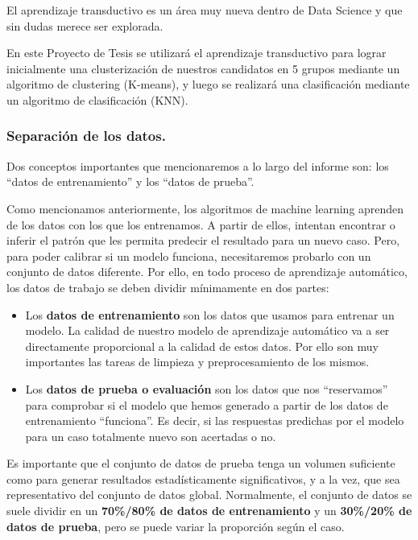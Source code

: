 \documentclass[12pt,a4paper]{article}
\begin{document}
\begin{sloppypar}
El aprendizaje transductivo es un área muy nueva dentro de Data Science y que sin dudas merece ser explorada.

En este Proyecto de Tesis se utilizará el aprendizaje transductivo para lograr inicialmente una clusterización de nuestros candidatos en 5 grupos mediante un algoritmo de clustering (K-means), y luego se realizará una clasificación mediante un algoritmo de clasificación (KNN). 

\subsubsection{Separación de los datos.}\label{Separacion datos}

Dos conceptos importantes que mencionaremos a lo largo del informe son: los “datos de entrenamiento” y los “datos de prueba”.

Como mencionamos anteriormente, los algoritmos de machine learning aprenden de los datos con los que los entrenamos. A partir de ellos, intentan encontrar o inferir el patrón que les permita predecir el resultado para un nuevo caso. Pero, para poder calibrar si un modelo funciona, necesitaremos probarlo con un conjunto de datos diferente. Por ello, en todo proceso de aprendizaje automático, los datos de trabajo se deben dividir mínimamente en dos partes:

\begin{itemize}
\item Los \textbf{datos de entrenamiento} son los datos que usamos para entrenar un modelo. La calidad de nuestro modelo de aprendizaje automático va a ser directamente proporcional a la calidad de estos datos. Por ello son muy importantes las tareas de limpieza y preprocesamiento de los mismos.
\item Los \textbf{datos de prueba o evaluación} son los datos que nos “reservamos” para comprobar si el modelo que hemos generado a partir de los datos de entrenamiento “funciona”. Es decir, si las respuestas predichas por el modelo para un caso totalmente nuevo son acertadas o no.
\end{itemize}


Es importante que el conjunto de datos de prueba tenga un volumen suficiente como para generar resultados estadísticamente significativos, y a la vez, que sea representativo del conjunto de datos global. Normalmente, el conjunto de datos se suele dividir en un \textbf{70\%/80\% de datos de entrenamiento} y un \textbf{30\%/20\% de datos de prueba}, pero se puede variar la proporción según el caso\cite{apunte_uba}. 



\end{sloppypar}
\end{document}
